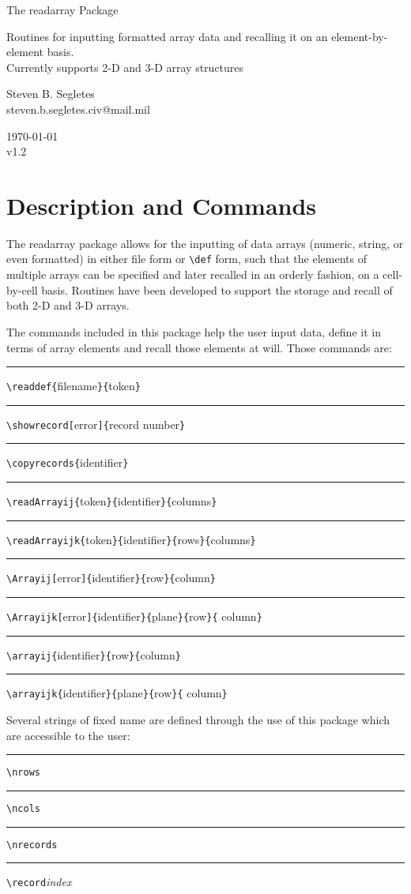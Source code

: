 \documentclass{article}
\def\version{1.2}
\newcommand\rl{\rule{1em}{0in}}
\def\rdar{\textsf{readarray}}
\let\vb\verb
\begin{document}
\begin{center}
\LARGE The {\rdar} Package\\
\rule{0em}{.7em}\small Routines for inputting formatted array data and 
recalling it on an element-by-element basis.\\Currently supports 2-D 
and 3-D array structures\\
\rule{0em}{2.7em}\large Steven B. Segletes\\
steven.b.segletes.civ@mail.mil\\
\rule{0em}{1.7em}\today\\
v\version
\end{center}

\section{Description and Commands}

The {\rdar} package allows for the inputting of data arrays (numeric,
string, or even formatted) in either file form or \vb|\def| form, such
that the elements of multiple arrays can be specified and later recalled
in an orderly fashion, on a cell-by-cell basis.  Routines have been
developed to support the storage and recall of both 2-D and 3-D arrays.

The commands included in this package help the user input data, define
it in terms of array elements and recall those elements at will. Those
commands are:\\\itshape
\rl\vb|\readdef{|filename\vb|}{|token\vb|}|\\
\rl\vb|\showrecord[|error\vb|]{|record number\vb|}|\\
\rl\vb|\copyrecords{|identifier\vb|}|\\
\rl\vb|\readArrayij{|token\vb|}{|identifier\vb|}{|columns\vb|}|\\
\rl\vb|\readArrayijk{|token\vb|}{|identifier\vb|}{|rows\vb|}{|columns\vb|}|\\
\rl\vb|\Arrayij[|error\vb|]{|identifier\vb|}{|row\vb|}{|column\vb|}|\\
\rl\vb|\Arrayijk[|error\vb|]{|identifier\vb|}{|plane\vb|}{|row\vb|}{|%
     column\vb|}|\\
\rl\vb|\arrayij{|identifier\vb|}{|row\vb|}{|column\vb|}|\\
\rl\vb|\arrayijk{|identifier\vb|}{|plane\vb|}{|row\vb|}{|%
     column\vb|}|\upshape 

Several strings of fixed name are defined through the use of this
package which are accessible to the user:\\
\rl\vb|\nrows|\\
\rl\vb|\ncols|\\
\rl\vb|\nrecords|\\
\rl\vb|\record|\textit{index}
\end{document}
